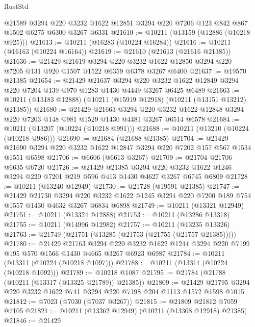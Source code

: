 \begin{lexlean}{RustStd}
\begin{coremodule}
    @21589
    @3294
    @220
    @3232
    @1622
    @12851
    @3294
    @220
    @7206
    @123
    @842
    @867
    @1502
    @6275
    @6300
    @3267
    @6331
@21610 := @10211 (@13159 (@12886 (@10218 @925)))
@21613 := @10211 (@16283 (@10224 @16284))
@21616 := @10211 (@16163 (@10224 @16164))
@21619 := @21610 (@21613 (@21616 @21385))
@21636 := @21429
    @21619
    @3294
    @220
    @3232
    @1622
    @12850
    @3294
    @220
    @7205
    @131
    @920
    @1507
    @1522
    @6359
    @6378
    @3267
    @6400
@21637 := @19570 @21385
@21654 := @21429
    @21637
    @3294
    @220
    @3232
    @1622
    @12849
    @3294
    @220
    @7204
    @139
    @970
    @1283
    @1430
    @4449
    @3267
    @6425
    @6489
@21663 := @10211 (@13183 @12888) (@10211 (@15919 @12918) (@10211 (@13151 @13212) @21385))
@21680 := @21429
    @21663
    @3294
    @220
    @3232
    @1622
    @12848
    @3294
    @220
    @7203
    @148
    @981
    @1529
    @1430
    @4481
    @3267
    @6514
    @6578
@21684 := @10211 (@13207 (@10224 (@10218 @991)))
@21688 := @10211 (@13210 (@10224 (@10218 @986)))
@21690 := @21684 (@21688 @21385)
@21704 := @21429 @21690 @3294 @220 @3232 @1622 @12847 @3294 @220 @7202 @157 @567 @1534 @1551 @6598
@21706 := @6606 (@6613 @3267)
@21709 := @21704 @21706 @6635 @6720
@21726 := @21429
    @21385
    @3294
    @220
    @3232
    @1622
    @1246
    @3294
    @220
    @7201
    @219
    @596
    @413
    @1430
    @4627
    @3267
    @6745
    @6809
@21728 := @10211 (@13240 @12949)
@21730 := @21728 (@19591 @21385)
@21747 := @21429
    @21730
    @3294
    @220
    @3232
    @1622
    @1245
    @3294
    @220
    @7200
    @189
    @754
    @1557
    @1430
    @4632
    @3267
    @6834
    @6898
@21749 := @10211 (@13321 @12949)
@21751 := @10211 (@13324 @12888)
@21753 := @10211 (@13286 @13318)
@21755 := @10211 (@14996 @12982)
@21757 := @10211 (@13235 @13326)
@21763 := @21749 (@21751 (@13285 (@21753 (@21755 (@21757 @21385)))))
@21780 := @21429
    @21763
    @3294
    @220
    @3232
    @1622
    @1244
    @3294
    @220
    @7199
    @195
    @570
    @1566
    @1430
    @4665
    @3267
    @6923
    @6987
@21784 := @10211 (@13311 (@10224 (@10218 @1097)))
@21788 := @10211 (@13314 (@10224 (@10218 @1092)))
@21789 := @10218 @1087
@21795 := @21784 (@21788 (@10211 (@13317 (@13325 @21789)) @21385))
@21809 := @21429 @21795 @3294 @220 @3232 @1622 @741 @3294 @220 @7198 @204 @1113 @1572 @1598 @7015
@21812 := @7023 (@7030 (@7037 @3267))
@21815 := @21809 @21812 @7059 @7105
@21821 := @10211 (@13362 @12949) (@10211 (@13308 @12918) @21385)
@21846 := @21429

\end{coremodule}
\end{lexlean}
